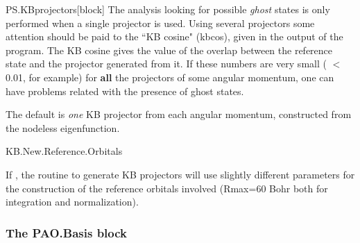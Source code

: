 \begin{fdfentry}{PS.KBprojectors}[block]
The analysis looking for possible \textit{ghost} states is only performed
when a single projector is used.  Using several projectors some
attention should be paid to the ``KB cosine" (kbcos), given in the
output of the program.  The KB cosine gives the value of the overlap
between the reference state and the projector generated from it.  If
these numbers are very small ( $<$ 0.01, for example) for \textbf{all}
the projectors of some angular momentum, one can have problems related
with the presence of ghost states.

The default is \emph{one} KB projector from each angular momentum,
constructed from the nodeless eigenfunction.

\end{fdfentry}  


\begin{fdflogicalF}{KB.New.Reference.Orbitals}

  If \fdftrue, the routine to generate KB projectors will use slightly
  different parameters for the construction of the reference orbitals
  involved (Rmax=60 Bohr both for integration and normalization).
  
\end{fdflogicalF}


\subsubsection{The PAO.Basis block}


